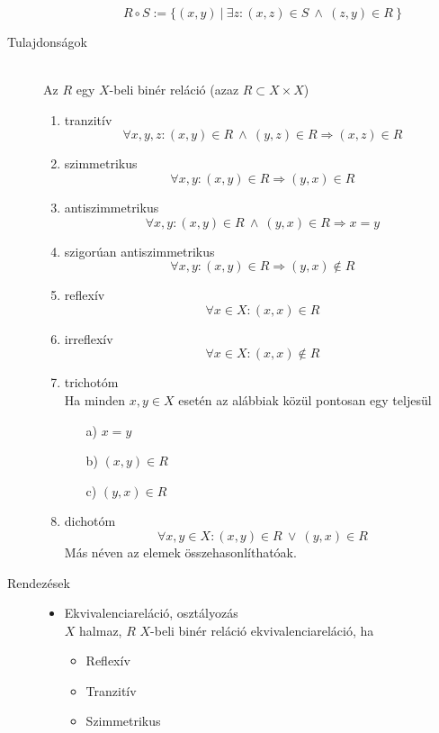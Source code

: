 \documentclass[margin=0px]{article}
\begin{document}
\begin{description}
\begin{itemize}
                  \[ R \circ S := \{ (x,y) \ | \ \exists z : (x,z) \in S \ \land \ (z,y) \in R \ \} \]
        \end{itemize}
    \item[Tulajdonságok] \hfill \\
        Az $R$ egy $X$-beli binér reláció (azaz $R \subset X\times X$)
        \begin{enumerate}
            \item tranzitív \\
                  \[\forall x,y,z : (x,y)\in R \ \land \ (y,z) \in R \Longrightarrow (x,z) \in R \]
            \item szimmetrikus \\
                  \[\forall x,y : (x,y)\in R \Longrightarrow (y,x) \in R \]
            \item antiszimmetrikus \\
                  \[\forall x,y : (x,y)\in R \ \land \ (y,x) \in R \Longrightarrow x = y\]
            \item szigorúan antiszimmetrikus \\
                  \[\forall x,y : (x,y)\in R \Longrightarrow (y,x) \notin R\]
            \item reflexív \\
                  \[\forall x \in X : (x,x)\in R\]
            \item irreflexív \\
                  \[\forall x \in X : (x,x)\notin R\]
            \item trichotóm \\
                  Ha minden $x,y \in X$ esetén az alábbiak közül pontosan egy teljesül
                  \begin{enumerate}
                      \item[a)] $x=y$
                      \item[b)] $(x,y) \in R$
                      \item[c)] $(y,x) \in R$
                  \end{enumerate}
            \item dichotóm \\
                  \[\forall x,y \in X : (x,y) \in R \ \lor \ (y,x) \in R\]
                  Más néven az elemek összehasonlíthatóak.
        \end{enumerate}
    \item[Rendezések] \hfill
        \begin{itemize}
            \item Ekvivalenciareláció, osztályozás \\
                  $X$ halmaz, $R$ $X$-beli binér reláció ekvivalenciareláció, ha
                  \begin{itemize}
                      \item Reflexív
                      \item Tranzitív
                      \item Szimmetrikus
                  \end{itemize}


\end{itemize}
\end{description}
\end{document}

